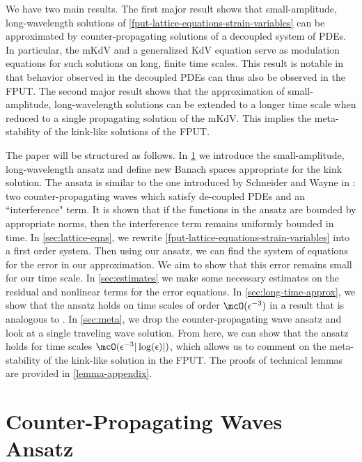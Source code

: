 \documentclass[oneside,reqno]{amsart}
\begin{document}
We have two main results. The first major result shows that small-amplitude, long-wavelength solutions of \cref{fput-lattice-equations-strain-variables} can be approximated by counter-propagating solutions of a decoupled system of PDEs. In particular, the mKdV and a generalized KdV equation serve as modulation equations for such solutions on long, finite time scales. This result is notable in that behavior observed in the decoupled PDEs can thus also be observed in the FPUT. The second major result shows that the approximation of small-amplitude, long-wavelength solutions can be extended to a longer time scale when reduced to a single propagating solution of the mKdV. This implies the meta-stability of the kink-like solutions of the FPUT. 

The paper will be structured as follows. In \cref{sec:ansatz} we introduce the small-amplitude, long-wavelength ansatz and define new Banach spaces appropriate for the kink solution. The ansatz is similar to the one introduced by Schneider and Wayne in \cite{schneider2000counter}: two counter-propagating waves which satisfy de-coupled PDEs and an ``interference" term. It is shown that if the functions in the ansatz are bounded by appropriate norms, then the interference term remains uniformly bounded in time. In \cref{sec:lattice-eqns}, we rewrite \cref{fput-lattice-equations-strain-variables} into a first order system. Then using our ansatz, we can find the system of equations for the error in our approximation. We aim to show that this error remains small for our time scale. In \cref{sec:estimates} we make some necessary estimates on the residual and nonlinear terms for the error equations. In \cref{sec:long-time-approx}, we show that the ansatz holds on time scales of order \(\mcO(\epsilon^{-3})\) in a result that is analogous to \cite{schneider2000counter}. In \cref{sec:meta}, we drop the counter-propagating wave ansatz and look at a single traveling wave solution. From here, we can show that the ansatz holds for time scales \(\mcO(\epsilon^{-3}|\log(\epsilon)|)\), which allows us to comment on the meta-stability of the kink-like solution in the FPUT. The proofs of technical lemmas are provided in \cref{lemma-appendix}.


\section{Counter-Propagating Waves Ansatz}\label{sec:ansatz}
\end{document}
